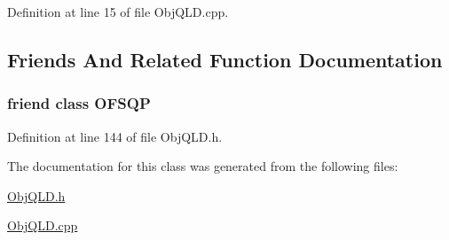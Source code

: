 Definition at line 15 of file Obj\+Q\+L\+D.\+cpp.



\subsection{Friends And Related Function Documentation}
\subsubsection[{\texorpdfstring{O\+F\+S\+QP}{OFSQP}}]{\setlength{\rightskip}{0pt plus 5cm}friend class {\bf O\+F\+S\+QP}\hspace{0.3cm}{\ttfamily [friend]}}\hypertarget{classocra_1_1ObjQLD_a35ebfe61821cfb93672b26cc472c939e}{}\label{classocra_1_1ObjQLD_a35ebfe61821cfb93672b26cc472c939e}


Definition at line 144 of file Obj\+Q\+L\+D.\+h.



The documentation for this class was generated from the following files\+:\begin{DoxyCompactItemize}
\item 
\hyperlink{ObjQLD_8h}{Obj\+Q\+L\+D.\+h}\item 
\hyperlink{ObjQLD_8cpp}{Obj\+Q\+L\+D.\+cpp}\end{DoxyCompactItemize}

